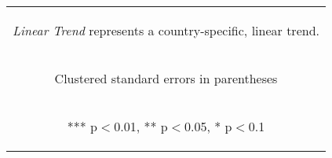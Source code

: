 \documentclass{article}
\begin{document}
\begin{table}[htbp]
{\begin{tabular}{lc}
\multicolumn{2}{c}{\begin{footnotesize} \textit{Linear Trend} represents a country-specific, linear trend.  \end{footnotesize}} \\
\multicolumn{2}{c}{\begin{footnotesize} Clustered standard errors in parentheses\end{footnotesize}} \\
\multicolumn{2}{c}{\begin{footnotesize} *** p$<$0.01, ** p$<$0.05, * p$<$0.1\end{footnotesize}} \\
\end{tabular}
}
\end{table}

\pagebreak
\end{document}

